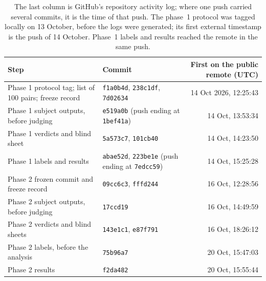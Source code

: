 \documentclass[11pt]{article}
\begin{document}
\begin{table}[h]
\centering
\small
\begin{tabular}{>{\raggedright\arraybackslash}p{6.2cm}>{\raggedright\arraybackslash}p{3.6cm}r}
\toprule
Step & Commit & First on the public remote (UTC) \\
\midrule
Phase 1 protocol tag; list of 100 pairs; freeze record & \texttt{f1a0b4d}, \texttt{238c1df}, \texttt{7d02634} & 14 Oct 2026, 12:25:43 \\
Phase 1 subject outputs, before judging & \texttt{e519a0b} (push ending at \texttt{1bef41a}) & 14 Oct, 13:53:34 \\
Phase 1 verdicts and blind sheet & \texttt{5a573c7}, \texttt{101cb40} & 14 Oct, 14:23:50 \\
Phase 1 labels and results & \texttt{abae52d}, \texttt{223be1e} (push ending at \texttt{7edcc59}) & 14 Oct, 15:25:28 \\
Phase 2 frozen commit and freeze record & \texttt{09cc6c3}, \texttt{fffd244} & 16 Oct, 12:28:56 \\
Phase 2 subject outputs, before judging & \texttt{17ccd19} & 16 Oct, 14:49:59 \\
Phase 2 verdicts and blind sheets & \texttt{143e1c1}, \texttt{e87f791} & 16 Oct, 18:26:12 \\
Phase 2 labels, before the analysis & \texttt{75b96a7} & 20 Oct, 15:47:03 \\
Phase 2 results & \texttt{f2da482} & 20 Oct, 15:55:44 \\
\bottomrule
\end{tabular}
\caption{The last column is GitHub's repository activity log; where one push carried
several commits, it is the time of that push. The phase~1 protocol was tagged locally
on 13 October, before the logs were generated; its first external timestamp is the
push of 14 October. Phase~1 labels and results reached the remote in the same push.}
\end{table}
\end{document}
